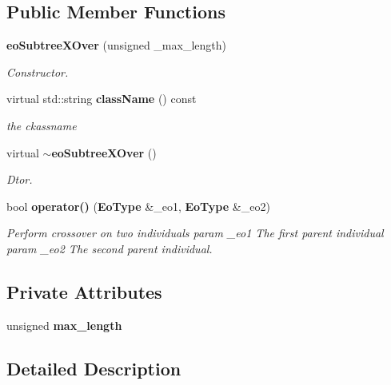 \subsection*{Public Member Functions}
\begin{CompactItemize}
\item 
{\bf eo\-Subtree\-XOver} (unsigned \_\-max\_\-length)
\begin{CompactList}\small\item\em Constructor. \item\end{CompactList}\item 
virtual std::string {\bf class\-Name} () const \label{classeo_subtree_x_over_a1}

\begin{CompactList}\small\item\em the ckassname \item\end{CompactList}\item 
virtual {\bf $\sim$eo\-Subtree\-XOver} ()\label{classeo_subtree_x_over_a2}

\begin{CompactList}\small\item\em Dtor. \item\end{CompactList}\item 
bool {\bf operator()} ({\bf Eo\-Type} \&\_\-eo1, {\bf Eo\-Type} \&\_\-eo2)\label{classeo_subtree_x_over_a3}

\begin{CompactList}\small\item\em Perform crossover on two individuals param \_\-eo1 The first parent individual param \_\-eo2 The second parent individual. \item\end{CompactList}\end{CompactItemize}
\subsection*{Private Attributes}
\begin{CompactItemize}
\item 
unsigned {\bf max\_\-length}\label{classeo_subtree_x_over_r0}

\end{CompactItemize}


\subsection{Detailed Description}

